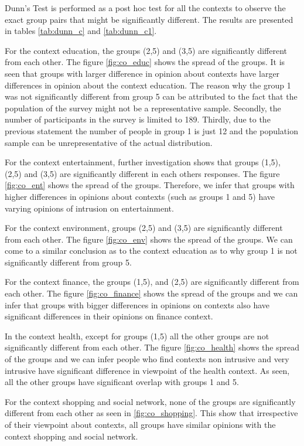 Dunn's Test is performed as a post hoc test for all the contexts to observe the exact group pairs that might be significantly different. The results are presented in tables \ref{tab:dunn_c} and \ref{tab:dunn_c1}. 

For the context education, the groups (2,5) and (3,5) are significantly different from each other. The figure \ref{fig:co_educ} shows the spread of the groups. It is seen that groups with larger difference in opinion about contexts have larger differences in opinion about the context education. The reason why the group 1 was not significantly different from group 5 can be attributed to the fact that the population of the survey might not be a representative sample. Secondly, the number of participants in the survey is limited to 189. Thirdly, due to the previous statement the number of people in group 1 is just 12 and the population sample can be unrepresentative of the actual distribution.

For the context entertainment, further investigation shows that groups (1,5), (2,5) and (3,5) are significantly different in each others responses. The figure \ref{fig:co_ent} shows the spread of the groups. Therefore, we infer that groups with higher differences in opinions about contexts (such as groups 1 and 5) have varying opinions of intrusion on entertainment.

For the context environment, groups (2,5) and (3,5) are significantly different from each other. The figure \ref{fig:co_env} shows the spread of the groups. We can come to a similar conclusion as to the context education as to why group 1 is not significantly different from group 5.

For the context finance, the groups (1,5), and (2,5) are significantly different from each other. The figure \ref{fig:co_finance} shows the spread of the groups and we can infer that groups with bigger differences in opinions on contexts also have significant differences in their opinions on finance context.

In the context health, except for groups (1,5) all the other groups are not significantly different from each other. The figure \ref{fig:co_health} shows the spread of the groups and we can infer people who find contexts non intrusive and very intrusive have significant difference in viewpoint of the health context. As seen, all the other groups have significant overlap with groups 1 and 5.

For the context shopping and social network, none of the groups are significantly different from each other as seen in \ref{fig:co_shopping}. This show that irrespective of their viewpoint about contexts, all groups have similar opinions with the context shopping and social network.

